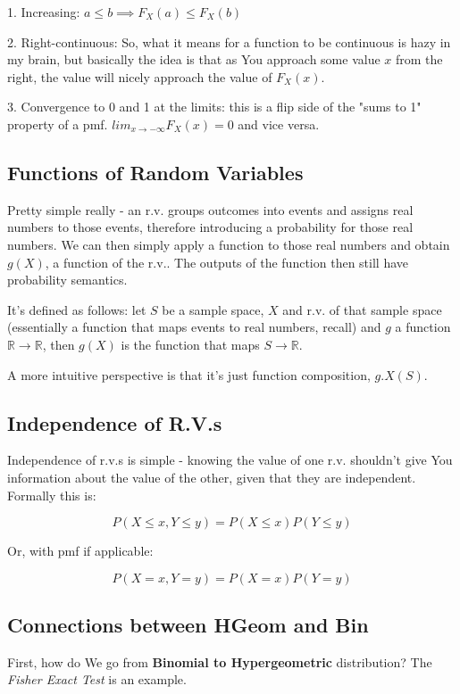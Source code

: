\documentclass{article}
\begin{document}
		1. Increasing: $a \le b \implies F_X(a) \le F_X(b)$
		
		2. Right-continuous: So, what it means for a function to be continuous is hazy in my brain, but basically the idea is that as You approach some value $x$ from the right, the value will nicely approach the value of $F_X(x)$.
		
		3. Convergence to 0 and 1 at the limits: this is a flip side of the "sums to 1" property of a pmf. $ lim_{x \to -\infty}F_X(x) = 0$ and vice versa.
		
	\subsection{Functions of Random Variables}
	
		Pretty simple really - an r.v. groups outcomes into events and assigns real numbers to those events, therefore introducing a probability for those real numbers. We can then simply apply a function to those real numbers and obtain $g(X)$, a function of the r.v.. The outputs of the function then still have probability semantics.
		
		It's defined as follows: let $S$ be a sample space, $X$ and r.v. of that sample space (essentially a function that maps events to real numbers, recall) and $g$ a function $\mathbb{R} \to \mathbb{R}$, then $g(X)$ is the function that maps $S \to \mathbb{R}$.
		
		A more intuitive perspective is that it's just function composition, $g.X(S)$.
		
	\subsection{Independence of R.V.s}
	
		Independence of r.v.s is simple - knowing the value of one r.v. shouldn't give You information about the value of the other, given that they are independent. Formally this is:
		
		$$P(X \le x, Y \le y) = P(X \le x)P(Y \le y)$$
		
		Or, with pmf if applicable:
		
		$$P(X = x, Y = y) = P(X = x)P(Y = y)$$
		
	\subsection{Connections between HGeom and Bin}
	
		First, how do We go from \textbf{Binomial to Hypergeometric} distribution? The \textit{Fisher Exact Test} is an example.
		
\end{document}
